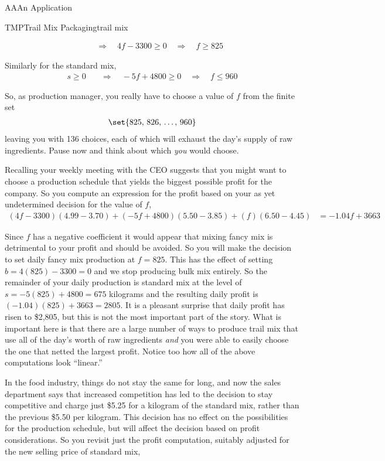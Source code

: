 \begin{subsect}{AA}{An Application}
\begin{example}{TMP}{Trail Mix Packaging}{trail mix}
\begin{para}
\begin{align*}
&\quad\Rightarrow\quad 4f-3300\geq 0
\quad\Rightarrow\quad f\geq 825
\end{align*}\end{para}
%
\begin{para}Similarly for the standard mix,
%
\begin{align*}
s\geq 0
&\quad\Rightarrow\quad -5f+4800\geq 0
\quad\Rightarrow\quad f\leq 960
\end{align*}\end{para}
%
\begin{para}So, as production manager, you really have to choose a value of $f$ from the finite set \begin{align*}
\set{825,\,826,\,\ldots,\,960}
\end{align*}
leaving you with 136 choices, each of which will exhaust the day's supply of raw ingredients.  Pause now and think about which {\em you} would choose.\end{para}
%
\begin{para}Recalling your weekly meeting with the CEO suggests that you might want to choose a production schedule that yields the biggest possible profit for the company.  So you compute an expression for the profit based on your as yet undetermined decision for the value of $f$,
%
\begin{align*}
(4f-3300)(4.99-3.70)+(-5f+4800)(5.50-3.85)+(f)(6.50-4.45)&=-1.04f + 3663
\end{align*}
\end{para}
%
\begin{para}Since $f$ has a negative coefficient it would appear that mixing fancy mix is detrimental to your profit and should be avoided.  So you will make the decision to set daily fancy mix production at $f=825$.  This has the effect of setting $b=4(825)-3300=0$ and we stop producing bulk mix entirely.  So the remainder of your daily production is standard mix at the level of $s=-5(825)+4800=675$ kilograms and the resulting daily profit is $(-1.04)(825)+3663=2805$.  It is a pleasant surprise that daily profit has risen to \$2,805, but this is not the most important part of the story.  What is important here is that there are a large number of ways to produce trail mix that use all of the day's worth of raw ingredients {\em and} you were able to easily choose the one that netted the largest profit.  Notice too how all of the above computations look ``linear.''\end{para}
%
\begin{para}In the food industry, things do not stay the same for long, and now the sales department says that increased competition has led to the decision to stay competitive and charge just \$5.25 for a kilogram of the standard mix, rather than the previous \$5.50 per kilogram.  This decision has no effect on the possibilities for the production schedule, but will affect the decision based on profit considerations.  So you revisit just the profit computation, suitably adjusted for the new selling price of standard mix,

\end{para}
\end{example}
\end{subsect}
